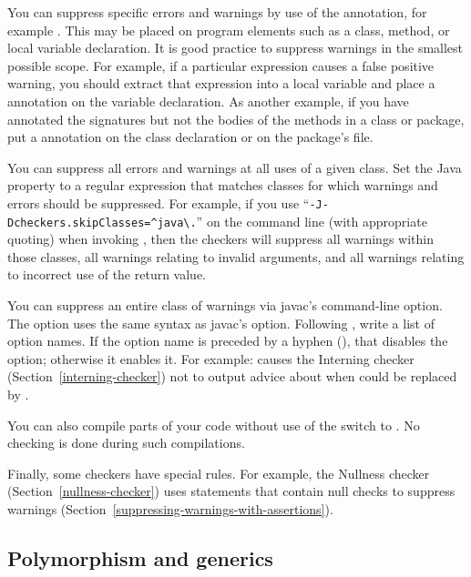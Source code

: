 You can suppress specific errors and warnings by use of the
 annotation, for example
.
This may be placed on program elements such as a class, method, or local
variable declaration.  It is good practice to suppress warnings in the
smallest possible scope.  For example, if a particular expression causes a
false positive warning, you should extract that expression into a local variable
and place a  annotation on the variable
declaration.
As another example, if you have annotated the signatures but not the bodies
of the methods in a class or package, put a 
annotation on the class declaration or on the package's
 file.

You can suppress all errors and warnings at all uses of a given class.
Set the  Java property to a
regular expression that matches classes for which warnings and errors
should be suppressed.  For example, if you use
``{\codesize\verb|-J-Dcheckers.skipClasses=^java\.|}'' on the command line
(with appropriate quoting) when invoking
, then the checkers will suppress all warnings within those
classes, all warnings relating to invalid arguments, and all warnings
relating to incorrect use of the return value.

You can suppress an entire class of warnings via javac's 
command-line option.  The  option uses the same syntax as
javac's  option.
Following , write a list of option
names.  If the option name is preceded by a hyphen (\code{-}), that
disables the option; otherwise it enables it.  For example:
 causes the Interning checker
(Section~\ref{interning-checker}) not to output advice about when 
could be replaced by .

You can also compile parts of your code without use of the
 switch to .  No checking is done during
such compilations.

Finally, some checkers have special rules.  For example, the Nullness
checker (Section~\ref{nullness-checker}) uses  statements that contain
null checks to suppress warnings
(Section~\ref{suppressing-warnings-with-assertions}).



\subsection{Polymorphism and generics\label{polymorphism}}

